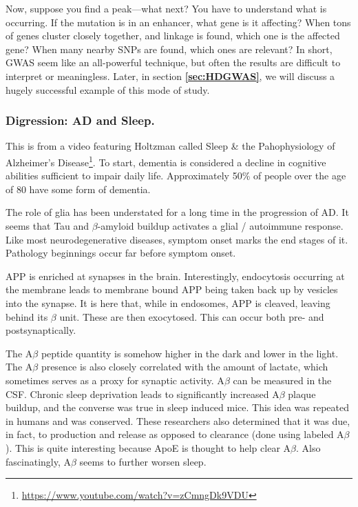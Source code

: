 Now, suppose you find a peak---what next? You have to understand what is occurring. If the mutation is in an enhancer, what gene is it affecting? When tons of genes cluster closely together, and linkage is found, which one is the affected gene? When many nearby SNPs are found, which ones are relevant? In short, GWAS seem like an all-powerful technique, but often the results are difficult to interpret or meaningless. Later, in section \textbf{\ref{sec:HDGWAS}}, we will discuss a hugely successful example of this mode of study. 


\subsubsection*{Digression: AD and Sleep.} 

This is from a video featuring Holtzman called Sleep \& the Pahophysiology of Alzheimer's Disease\footnote{\url{https://www.youtube.com/watch?v=zCmngDk9VDU}}. To start, dementia is considered a decline in cognitive abilities sufficient to impair daily life. Approximately 50\% of people over the age of 80 have some form of dementia.\newline

The role of glia has been understated for a long time in the progression of AD. It seems that Tau and $\beta$-amyloid buildup activates a glial / autoimmune response. Like most neurodegenerative diseases, symptom onset marks the end stages of it. Pathology beginnings occur far before symptom onset.\newline

APP is enriched at synapses in the brain. Interestingly, endocytosis occurring at the membrane leads to membrane bound APP being taken back up by vesicles into the synapse. It is here that, while in endosomes, APP is cleaved, leaving behind its $\beta$ unit. These are then exocytosed. This can occur both pre- and postsynaptically.\newline

The A$\beta$ peptide quantity is somehow higher in the dark and lower in the light. The A$\beta$ presence is also closely correlated with the amount of lactate, which sometimes serves as a proxy for synaptic activity. A$\beta$ can be measured in the CSF. Chronic sleep deprivation leads to significantly increased A$\beta$ plaque buildup, and the converse was true in sleep induced mice. This idea was repeated in humans and was conserved. These researchers also determined that it was due, in fact, to production and release as opposed to clearance (done using labeled A$\beta$). This is quite interesting because ApoE is thought to help clear A$\beta$. Also fascinatingly, A$\beta$ seems to further worsen sleep.\newline

